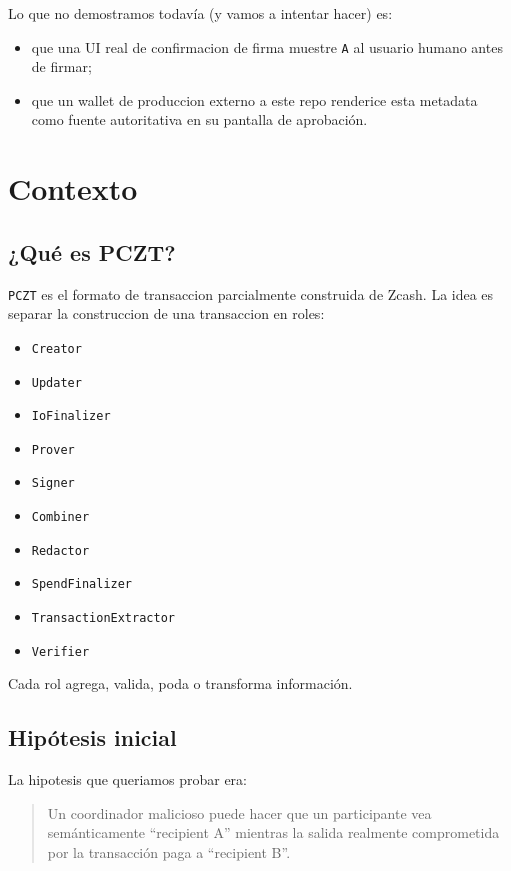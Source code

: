 \documentclass[11pt,a4paper]{article}
\begin{document}
Lo que no demostramos todavía (y vamos a intentar hacer) es:

\begin{itemize}[leftmargin=2em]
    \item que una UI real de confirmacion de firma muestre \texttt{A} al usuario humano antes de firmar;
    \item que un wallet de produccion externo a este repo renderice esta metadata como fuente autoritativa en su pantalla de aprobación.
\end{itemize}

\section{Contexto}

\subsection{¿Qué es PCZT?}

\texttt{PCZT} es el formato de transaccion parcialmente construida de Zcash. La idea es separar la construccion de una transaccion en roles:

\begin{itemize}[leftmargin=2em]
    \item \texttt{Creator}
    \item \texttt{Updater}
    \item \texttt{IoFinalizer}
    \item \texttt{Prover}
    \item \texttt{Signer}
    \item \texttt{Combiner}
    \item \texttt{Redactor}
    \item \texttt{SpendFinalizer}
    \item \texttt{TransactionExtractor}
    \item \texttt{Verifier}
\end{itemize}

Cada rol agrega, valida, poda o transforma información.

\subsection{Hipótesis inicial}

La hipotesis que queriamos probar era:

\begin{quote}
Un coordinador malicioso puede hacer que un participante vea semánticamente ``recipient A'' mientras la salida realmente comprometida por la transacción paga a ``recipient B''.
\end{quote}
\end{document}
